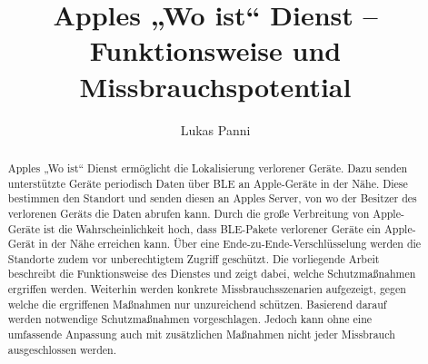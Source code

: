 \documentclass[runningheads]{llncs}
\begin{document}
\title{Apples „Wo ist“ Dienst – Funktionsweise und Missbrauchspotential}


\author{Lukas Panni}


\maketitle              %

\begin{abstract}
Apples „Wo ist“ Dienst ermöglicht die Lokalisierung verlorener Geräte.
Dazu senden unterstützte Geräte periodisch Daten über \ac{BLE} an Apple-Geräte in der Nähe.
Diese bestimmen den Standort und senden diesen an Apples Server, von wo der Besitzer des verlorenen Geräts die Daten abrufen kann.
Durch die große Verbreitung von Apple-Geräte ist die Wahrscheinlichkeit hoch, dass \ac{BLE}-Pakete verlorener Geräte ein Apple-Gerät in der Nähe erreichen kann.
Über eine Ende-zu-Ende-Verschlüsselung werden die Standorte zudem vor unberechtigtem Zugriff geschützt.
Die vorliegende Arbeit beschreibt die Funktionsweise des Dienstes und zeigt dabei, welche Schutzmaßnahmen ergriffen werden.
Weiterhin werden konkrete Missbrauchsszenarien aufgezeigt, gegen welche die ergriffenen Maßnahmen nur unzureichend schützen.
Basierend darauf werden notwendige Schutzmaßnahmen vorgeschlagen.
Jedoch kann ohne eine umfassende Anpassung auch mit zusätzlichen Maßnahmen nicht jeder Missbrauch ausgeschlossen werden.
\end{abstract}




\newpage








\end{document}
